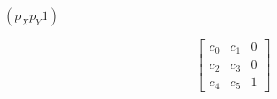 \documentclass{article}
\begin{document}
$(p_X p_Y 1)$
\pagebreak

\[ \left[ \begin{array}{ccc} c_0&c_1&0 \\ c_2&c_3&0 \\ c_4&c_5&1 \end{array} \right] \]
\pagebreak
\end{document}
